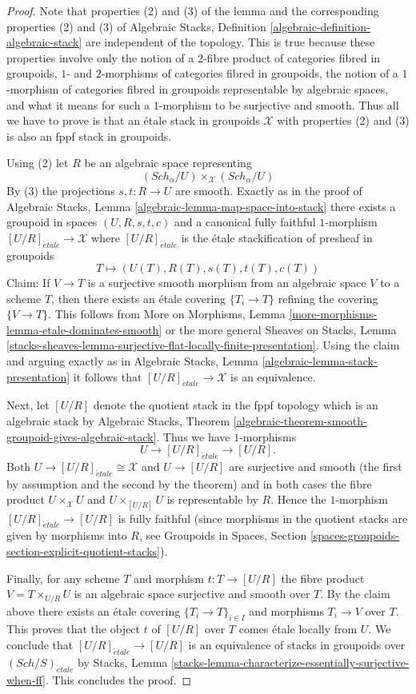 \documentclass{stacks-project}
\theoremstyle{plain}
\theoremstyle{definition}
\theoremstyle{remark}
\numberwithin{equation}{subsection}
\def\Sch{\mathit{Sch}}
\def\etale{{\acute{e}tale}}
\begin{document}
\begin{proof}
Note that properties (2) and (3) of the lemma and the corresponding
properties (2) and (3) of
Algebraic Stacks, Definition \ref{algebraic-definition-algebraic-stack}
are independent of the topology. This is true because these properties
involve only the notion of a $2$-fibre product of categories fibred in
groupoids, $1$- and $2$-morphisms of categories fibred in groupoids, the
notion of a $1$-morphism of categories fibred in groupoids representable
by algebraic spaces, and what it means for such a $1$-morphism to be
surjective and smooth.
Thus all we have to prove is that an \'etale stack in groupoids
$\mathcal{X}$ with properties (2) and (3) is also an fppf stack in groupoids.

\medskip\noindent
Using (2) let $R$ be an algebraic space representing
$$
(\Sch_\alpha/U) \times_\mathcal{X} (\Sch_\alpha/U)
$$
By (3) the projections $s, t : R \to U$ are smooth. Exactly as in the proof of
Algebraic Stacks, Lemma \ref{algebraic-lemma-map-space-into-stack}
there exists a groupoid in spaces $(U, R, s, t, c)$ and a canonical
fully faithful $1$-morphism $[U/R]_\etale \to \mathcal{X}$
where $[U/R]_\etale$ is the \'etale stackification of presheaf
in groupoids
$$
T \longmapsto (U(T), R(T), s(T), t(T), c(T))
$$
Claim: If $V \to T$ is a surjective smooth morphism from an algebraic space
$V$ to a scheme $T$, then there exists an \'etale covering $\{T_i \to T\}$
refining the covering $\{V \to T\}$. This follows from
More on Morphisms, Lemma \ref{more-morphisms-lemma-etale-dominates-smooth}
or the more general
Sheaves on Stacks, Lemma
\ref{stacks-sheaves-lemma-surjective-flat-locally-finite-presentation}.
Using the claim and arguing exactly as in
Algebraic Stacks, Lemma \ref{algebraic-lemma-stack-presentation}
it follows that $[U/R]_\etale \to \mathcal{X}$ is an
equivalence.

\medskip\noindent
Next, let $[U/R]$ denote the quotient stack in the fppf topology
which is an algebraic stack by
Algebraic Stacks, Theorem
\ref{algebraic-theorem-smooth-groupoid-gives-algebraic-stack}.
Thus we have $1$-morphisms
$$
U \to [U/R]_\etale \to [U/R].
$$
Both $U \to [U/R]_\etale \cong \mathcal{X}$ and
$U \to [U/R]$ are surjective and smooth (the first by assumption
and the second by the theorem) and in both cases the
fibre product $U \times_\mathcal{X} U$ and $U \times_{[U/R]} U$
is representable by $R$. Hence the $1$-morphism
$[U/R]_\etale \to [U/R]$ is fully faithful (since morphisms
in the quotient stacks are given by morphisms into $R$, see
Groupoids in Spaces, Section
\ref{spaces-groupoids-section-explicit-quotient-stacks}).

\medskip\noindent
Finally, for any scheme $T$ and morphism $t : T \to [U/R]$ the fibre product
$V = T \times_{U/R} U$ is an algebraic space surjective and smooth over $T$.
By the claim above there exists an \'etale covering $\{T_i \to T\}_{i \in I}$
and morphisms $T_i \to V$ over $T$. This proves that the object
$t$ of $[U/R]$ over $T$ comes \'etale locally from $U$. We conclude that
$[U/R]_\etale \to [U/R]$ is an equivalence of stacks in
groupoids over $(\Sch/S)_\etale$ by
Stacks, Lemma \ref{stacks-lemma-characterize-essentially-surjective-when-ff}.
This concludes the proof.
\end{proof}
\end{document}
